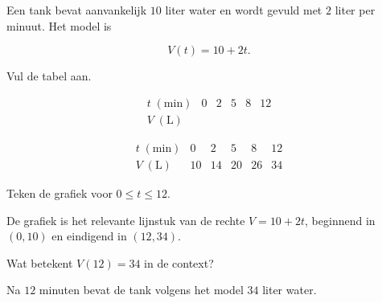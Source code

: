 \documentclass{ximera}
\begin{document}
\begin{oefening}{\oefB\ESS}

Een tank bevat aanvankelijk \(10\) liter water en wordt gevuld met
\(2\) liter per minuut. Het model is

\[
V(t)=10+2t.
\]

\begin{question}
Vul de tabel aan.

\[
\begin{array}{c|ccccc}
t\;(\mathrm{min})&0&2&5&8&12\\
\hline
V\;(\mathrm{L})&&&&&
\end{array}
\]

\begin{oplossing}
\[
\begin{array}{c|ccccc}
t\;(\mathrm{min})&0&2&5&8&12\\
\hline
V\;(\mathrm{L})&10&14&20&26&34
\end{array}
\]
\end{oplossing}
\end{question}

\begin{question}
Teken de grafiek voor \(0\leq t\leq 12\).

\begin{oplossing}
De grafiek is het relevante lijnstuk van de rechte \(V=10+2t\), beginnend
in \((0,10)\) en eindigend in \((12,34)\).
\end{oplossing}
\end{question}

\begin{question}
Wat betekent \(V(12)=34\) in de context?

\begin{oplossing}
Na \(12\) minuten bevat de tank volgens het model \(34\) liter water.
\end{oplossing}
\end{question}

\end{oefening}

\end{document}

